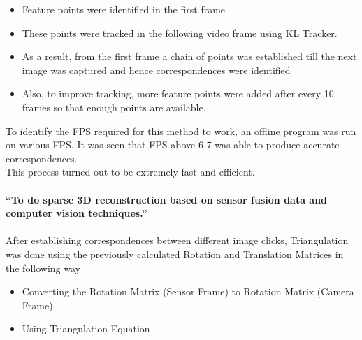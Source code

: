 \documentclass{article}
\begin{document}
		\begin{itemize}
		\item Feature points were identified in the first frame
		\item These points were tracked in the following video frame using KL Tracker.
		\item As a result, from the first frame a chain of points was established till the next image was captured and hence correspondences were identified
		\item Also, to improve tracking, more feature points were added after every 10 frames so that enough points are available.
		\end{itemize}
		To identify the FPS required for this method to work, an offline program was run on various FPS. It was seen that FPS above 6-7 was able to produce accurate correspondences.\\
		This process turned out to be extremely fast and efficient. 
		\\
		\vspace{6mm}
		\\
		\textbf{``To do sparse 3D reconstruction based on sensor fusion data and computer vision techniques.''}
		\\
		\vspace{3mm}
		\\
		After establishing correspondences between different image clicks, Triangulation was done using the previously calculated Rotation and Translation Matrices in the following way
		\begin{itemize}
		\item Converting the Rotation Matrix (Sensor Frame) to Rotation Matrix (Camera Frame)
		\item Using Triangulation Equation
		\end{itemize}
\end{document}
